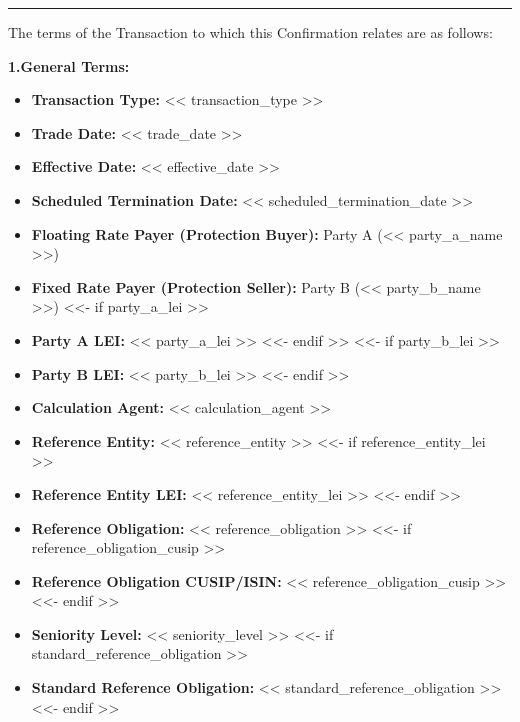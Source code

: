 \documentclass[11pt, a4paper]{article}
\begin{document}
\vspace{0.5cm}
\hrule
\vspace{0.5cm}

\noindent The terms of the Transaction to which this Confirmation relates are as follows:

\vspace{0.3cm}


\noindent \textbf{1.\quad General Terms:}
\begin{itemize}[leftmargin=2cm, label={}, itemsep=3pt]
    \item \textbf{Transaction Type:} << transaction_type >>
    \item \textbf{Trade Date:} << trade_date >>
    \item \textbf{Effective Date:} << effective_date >>
    \item \textbf{Scheduled Termination Date:} << scheduled_termination_date >>
    \item \textbf{Floating Rate Payer (Protection Buyer):} Party A (<< party_a_name >>)
    \item \textbf{Fixed Rate Payer (Protection Seller):} Party B (<< party_b_name >>)
<<- if party_a_lei >>
    \item \textbf{Party A LEI:} << party_a_lei >>
<<- endif >>
<<- if party_b_lei >>
    \item \textbf{Party B LEI:} << party_b_lei >>
<<- endif >>
    \item \textbf{Calculation Agent:} << calculation_agent >>
    \item \textbf{Reference Entity:} << reference_entity >>
<<- if reference_entity_lei >>
    \item \textbf{Reference Entity LEI:} << reference_entity_lei >>
<<- endif >>
    \item \textbf{Reference Obligation:} << reference_obligation >>
<<- if reference_obligation_cusip >>
    \item \textbf{Reference Obligation CUSIP/ISIN:} << reference_obligation_cusip >>
<<- endif >>
    \item \textbf{Seniority Level:} << seniority_level >>
<<- if standard_reference_obligation >>
    \item \textbf{Standard Reference Obligation:} << standard_reference_obligation >>
<<- endif >>
\end{itemize}
\end{document}
